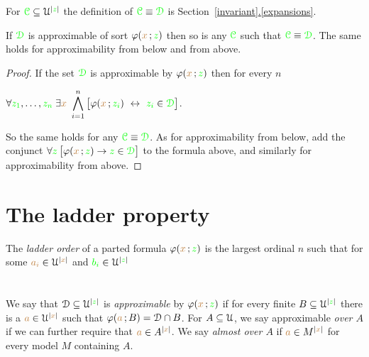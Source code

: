 \documentclass[creche.tex]{subfiles}
\begin{document}
For ${\color{green}\EuScript C}\subseteq\EuScript U^{|{\color{green} z}|}$ the definition of  ${\color{green}\EuScript C}\equiv{\color{green}\EuScript D}$ is Section~\hyperref[expansions]{\ref{invariant}.\ref{expansions}}.

\begin{proposition}\label{prop_approx_el_eq}
If ${\color{green}\EuScript D}$ is approximable of sort $\varphi({\color{brown} x}\,;{\color{green} z})$ then so is any ${\color{green}\EuScript C}$ such that ${\color{green}\EuScript C}\equiv{\color{green}\EuScript D}$. The same holds for approximability from below and from above.
\end{proposition}

\begin{proof}
If the set ${\color{green}\EuScript D}$ is approximable by $\varphi({\color{brown} x}\,;{\color{green} z})$ then for every $n$

\hfil$\displaystyle\A {\gr z_1},\dots,{\gr z_n}\;\E {\mr x}\ \bigwedge^n_{i=1}\big[\phi({\mr x}\,;{\gr z_i})\ \iff\ {\gr z_i}\in{\gr \D}\big]$. 

So the same holds for any ${\color{green}\EuScript C}\equiv{\color{green}\EuScript D}$. As for approximability from below, add the conjunct $\forall {\color{green}z}\,\big[\varphi({\color{brown} x}\,;{\color{green} z})\rightarrow {\color{green}z}\in{\color{green}\EuScript D}\big]$ to the formula above, and similarly for approximability from above.
\end{proof}


\section{The ladder property}

The \emph{ladder order\/} of a parted formula $\varphi({\color{brown} x}\,;{\color{green} z})$ is the largest ordinal $n$ such that for some ${\color{brown} a_i}\in\EuScript U^{|{\color{brown} x}|}$ and ${\color{green} b_i}\in\EuScript U^{|{\color{green} z}|}$ 


\section{}

We say that $\EuScript D\subseteq\EuScript U^{|{\color{green} z}|}$ is \emph{approximable\/} by $\varphi({\color{brown} x}\,;{\color{green} z})$ if for every finite $B\subseteq\EuScript U^{|{\color{green} z}|}$ there is a ${\color{brown} a}\in\EuScript U^{|{\color{brown} x}|}$ such that $\varphi({\color{brown} a}\,;B)=\EuScript D\cap B$. For $A\subseteq\EuScript U$, we say approximable \emph{over $A$\/} if we can further require that ${\color{brown} a}\in A^{|{\color{brown} x}|}$. We say \emph{almost over $A$\/} if  ${\color{brown} a}\in M^{|{\color{brown} x}|}$ for every model $M$ containing $A$.
\end{document}
